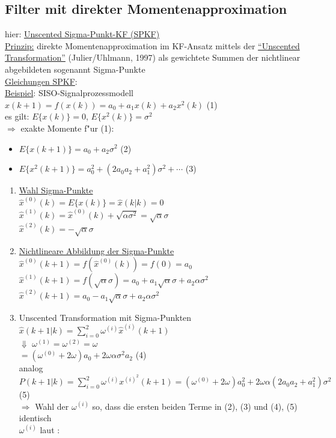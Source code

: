 \documentclass[openany,a4paper,11pt]{book}
\begin{document}
\subsection{Filter mit direkter Momentenapproximation}
hier: \uline{Unscented Sigma-Punkt-KF (SPKF)}\\
\uline{Prinzip:} direkte Momentenapproximation im KF-Ansatz mittels der \uline{``Unscented Transformation''} (Julier/Uhlmann, 1997) als gewichtete Summen der nichtlinear abgebildeten sogenannt Sigma-Punkte\\
\uline{Gleichungen SPKF}: \\
\uline{Beispiel}: SISO-Signalprozessmodell \\
$x(k+1)=f(x(k))=a_0+a_1x(k)+a_2x^2(k)$ \quad (1)\\
es gilt: $E\{x(k)\}=0$, $E\{x^2(k)\}=\sigma^2$\\
$\Rightarrow$ exakte Momente f"ur (1): \begin{itemize}
    \item $E\{x(k+1)\}=a_0+a_2\sigma^2$ \quad (2)
    \item $E\{x^2(k+1)\}=a_0^2+(2a_0a_2+a_1^2)\sigma^2+\cdots$ \quad (3)
\end{itemize}
\begin{enumerate}
    \item \uline{Wahl Sigma-Punkte}\\
    $\hat{x}^{(0)}(k)=E\{x(k)\}=\hat{x}(k|k)=0$\\
    $\hat{x}^{(1)}(k)=\hat{x}^{(0)}(k)+\sqrt{\alpha\sigma^2}=\sqrt{\alpha}\sigma$\\
    $\hat{x}^{(2)}(k)=-\sqrt{\alpha}\sigma$
    \item \uline{Nichtlineare Abbildung der Sigma-Punkte}\\
    $\hat{x}^{(0)}(k+1)=f(\hat{x}^{(0)}(k))=f(0)=a_0$\\
    $\hat{x}^{(1)}(k+1)=f(\sqrt{\alpha}\sigma)=a_0+a_1\sqrt{\alpha}\sigma+a_2\alpha\sigma^2$\\
    $\hat{x}^{(2)}(k+1)=a_0-a_1\sqrt{\alpha}\sigma+a_2\alpha\sigma^2$
    \item Unscented Transformation mit Sigma-Punkten\\
    $\displaystyle\hat{x}(k+1|k)=\sum_{i=0}^2\omega^{(i)}\hat{x}^{(i)}(k+1)$\\
    $\Downarrow$ $\omega^{(1)}=\omega^{(2)}=\omega$\\
    $=(\omega^{(0)}+2\omega)a_0+2\omega\alpha\sigma^2a_2$ \quad (4)\\
    analog $P(k+1|k)=\sum_{i=0}^2\omega^{(i)}x^{(i)^2}(k+1)=(\omega^{(0)}+2\omega)a_0^2+2\omega\alpha(2a_0a_2+a_1^2)\sigma^2$ \quad (5)\\
    $\Rightarrow$ Wahl der $\omega^{(i)}$ so, dass die ersten beiden Terme in (2), (3) und (4), (5) identisch\\
    $\omega^{(i)}$ laut :\\ 
\end{enumerate}
\end{document}
